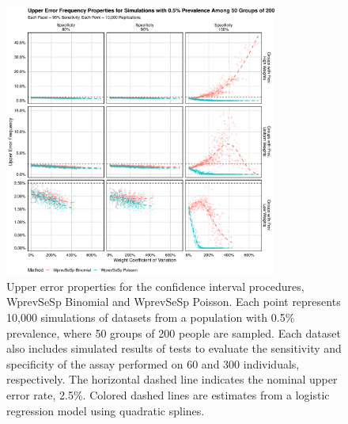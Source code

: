 \begin{figure}
\centering
\includegraphics[width=0.8\textwidth]{imperfect_upper_error_frequency_50_groups_0_005_prev}
\caption{Upper error properties for the confidence interval procedures, WprevSeSp Binomial and WprevSeSp Poisson.
Each point represents 10,000 simulations of datasets from a population with 0.5\% prevalence, where 50 groups of 200 people are sampled.
Each dataset also includes simulated results of tests to evaluate the sensitivity and specificity of the assay performed on 60 and 300 individuals, respectively.
The horizontal dashed line indicates the nominal upper error rate, 2.5\%.
Colored dashed lines are estimates from a logistic regression model using quadratic splines.}
\label{ch_3:fig:imperfect_upper_error_frequency_50_groups_0_005_prev}
\end{figure}

